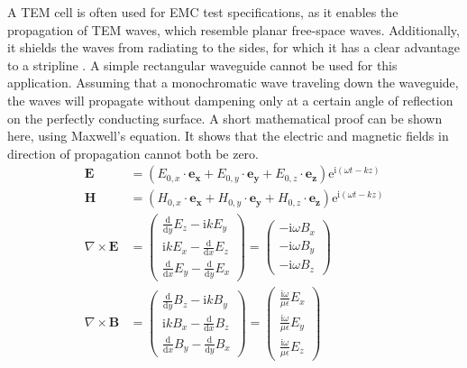 A TEM cell is often used for EMC test specifications, as it enables the propagation of TEM waves, which resemble planar free-space waves. Additionally, it shields the waves from radiating to the sides, for which it has a clear advantage to a stripline \cite{809846}. A simple rectangular waveguide cannot be used for this application. Assuming that a monochromatic wave traveling down the waveguide, the waves will propagate without dampening only at a certain angle of reflection on the perfectly conducting surface. A short mathematical proof can be shown here, using Maxwell's equation. It shows that the electric and magnetic fields in direction of propagation cannot both be zero. %
\begin{align}
    \mathbf{E}&=(E_{0,x}\cdot\mathbf{e_x}+E_{0,y}\cdot\mathbf{e_y}+E_{0,z}\cdot\mathbf{e_z})\mathrm{e}^{\mathrm{i}(\omega t-kz)}\\
    \mathbf{H}&=(H_{0,x}\cdot\mathbf{e_x}+H_{0,y}\cdot\mathbf{e_y}+H_{0,z}\cdot\mathbf{e_z})\mathrm{e}^{\mathrm{i}(\omega t-kz)}\\
    \nabla \times \mathbf{E} &=\begin{pmatrix}\frac{\mathrm{d}}{\mathrm{d}y}E_z-\mathrm{i}kE_y \\\mathrm{i}kE_x-\frac{\mathrm{d}}{\mathrm{d}x}E_z \\\frac{\mathrm{d}}{\mathrm{d}x}E_y-\frac{\mathrm{d}}{\mathrm{d}y}E_x\end{pmatrix}=\begin{pmatrix} -\mathrm{i}\omega B_x\\-\mathrm{i}\omega B_y\\ -\mathrm{i}\omega B_z \end{pmatrix}\\
    \nabla \times \mathbf{B} &=\begin{pmatrix}\frac{\mathrm{d}}{\mathrm{d}y}B_z-\mathrm{i}kB_y \\\mathrm{i}kB_x-\frac{\mathrm{d}}{\mathrm{d}x}B_z \\\frac{\mathrm{d}}{\mathrm{d}x}B_y-\frac{\mathrm{d}}{\mathrm{d}y}B_x\end{pmatrix}=\begin{pmatrix} \frac{\mathrm{i}\omega}{\mu\epsilon} E_x\\\frac{\mathrm{i}\omega}{\mu\epsilon} E_y\\ \frac{\mathrm{i}\omega}{\mu\epsilon} E_z \end{pmatrix}
\end{align}

